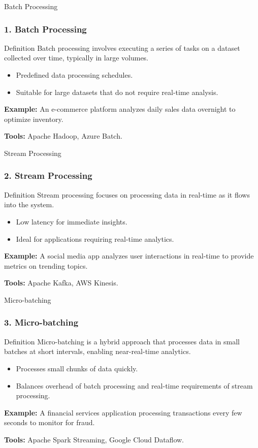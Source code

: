 \documentclass[aspectratio=169]{beamer}
\begin{document}
\begin{frame}{Batch Processing}
    \frametitle{1. Batch Processing}
    \begin{block}{Definition}
        Batch processing involves executing a series of tasks on a dataset collected over time, typically in large volumes.
    \end{block}
    
    \begin{itemize}
        \item Predefined data processing schedules.
        \item Suitable for large datasets that do not require real-time analysis.
    \end{itemize}
    
    \textbf{Example:} An e-commerce platform analyzes daily sales data overnight to optimize inventory.

    \textbf{Tools:} Apache Hadoop, Azure Batch.
\end{frame}

\begin{frame}{Stream Processing}
    \frametitle{2. Stream Processing}
    \begin{block}{Definition}
        Stream processing focuses on processing data in real-time as it flows into the system.
    \end{block}
    
    \begin{itemize}
        \item Low latency for immediate insights.
        \item Ideal for applications requiring real-time analytics.
    \end{itemize}
    
    \textbf{Example:} A social media app analyzes user interactions in real-time to provide metrics on trending topics.

    \textbf{Tools:} Apache Kafka, AWS Kinesis.
\end{frame}

\begin{frame}{Micro-batching}
    \frametitle{3. Micro-batching}
    \begin{block}{Definition}
        Micro-batching is a hybrid approach that processes data in small batches at short intervals, enabling near-real-time analytics.
    \end{block}
    
    \begin{itemize}
        \item Processes small chunks of data quickly.
        \item Balances overhead of batch processing and real-time requirements of stream processing.
    \end{itemize}

    \textbf{Example:} A financial services application processing transactions every few seconds to monitor for fraud.

    \textbf{Tools:} Apache Spark Streaming, Google Cloud Dataflow.
\end{frame}
\end{document}
